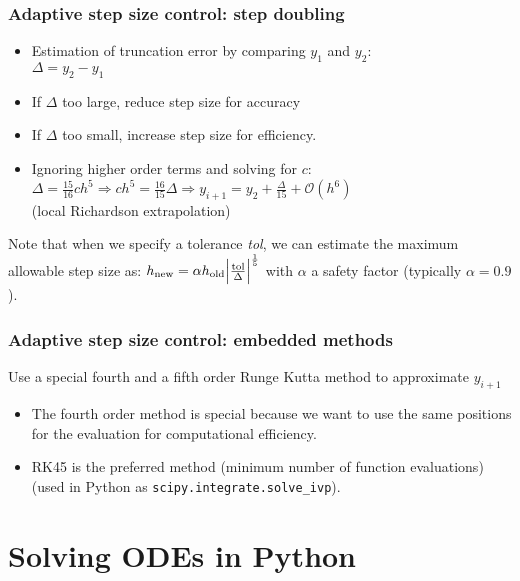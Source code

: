 \begin{frame}
  \frametitle{Adaptive step size control: step doubling}
\begin{itemize}
  \item Estimation of truncation error by comparing $y_1$ and $y_2$:\\
  $\Delta = y_2 - y_1$
  \item If $\Delta$ too large, reduce step size for accuracy
  \item If $\Delta$ too small, increase step size for efficiency.
  \item Ignoring higher order terms and solving for $c$:
  $ \Delta = \frac{15}{16}ch^5 \Rightarrow ch^5 = \frac{16}{15} \Delta \Rightarrow y_{i+1} = y_2 + \frac{\Delta}{15} + \mathcal{O}{(h^6)}$ \\ (local Richardson extrapolation)
\end{itemize}
  Note that when we specify a tolerance \emph{tol}, we can estimate the maximum allowable step size as:
  $ h_\text{new} = \alpha h_\text{old} \abs{\frac{\text{tol}}{\Delta}}^{\frac{1}{5}}$ with $\alpha$ a safety factor (typically $\alpha = 0.9$).
\end{frame}

\begin{frame}
  \frametitle{Adaptive step size control: embedded methods}
  Use a special fourth and a fifth order Runge Kutta method to approximate $y_{i+1}$
  \begin{itemize}
    \item The fourth order method is special because we want to use the same positions for the evaluation for computational efficiency.
    \item RK45 is the preferred method (minimum number of function evaluations) (used in Python as \lstinline$scipy.integrate.solve_ivp$).
  \end{itemize}
\end{frame}

\section{Solving ODEs in Python}
